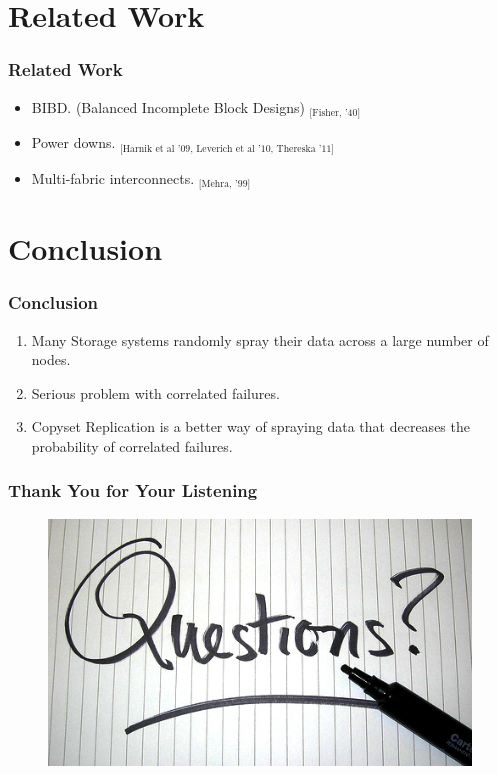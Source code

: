 \documentclass[xcolor=table]{beamer}
\begin{document}
	\section{Related Work}

	\begin{frame}
		\frametitle{Related Work}
		\begin{itemize}
			\item BIBD. (Balanced Incomplete Block Designs) $_\text{[Fisher, '40]}$
			\item Power downs. $_\text{[Harnik et al '09, Leverich et al '10, Thereska '11]}$
			\item Multi-fabric interconnects. $_\text{[Mehra, '99]}$
		\end{itemize}
	\end{frame}

	\section{Conclusion}

	\begin{frame}
		\frametitle{Conclusion}
		\begin{enumerate}
			\item Many Storage systems \alert{randomly} spray their data across a large number of nodes.
			\item Serious problem with \alert{correlated failures}.
			\item \alert{Copyset Replication} is a better way of spraying data that \alert{decreases the probability} of correlated failures.
		\end{enumerate}
	\end{frame}

	\begin{frame}
		\frametitle{Thank You for Your Listening}
		\begin{figure}[htb]
			\centering
			\graphicspath{{fig/}}
			\includegraphics[width=1\textwidth]{8.jpg}
		\end{figure}
	\end{frame}
\end{document}

